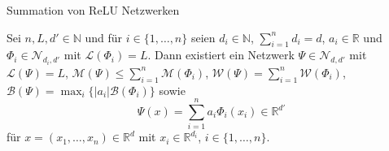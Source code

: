 \documentclass[10pt,aspectratio=169]{beamer}
\theoremstyle{plain} %
\theoremstyle{remark} %
\newcommand{\N}{\mathbb{N}} %
\newcommand{\R}{\mathbb{R}} %
\newcommand{\set}[1]{\{#1\}}
\begin{document}
\begin{frame}{Summation von ReLU Netzwerken}
    \begin{lemma}
        Sei \(n, L, d' \in\N\) und für \(i\in \set{1,\ldots, n}\) seien \(d_i \in \N\), \(\sum_{i=1}^n d_i = d\), 
        \(a_i \in \R\) und \(\Phi_i \in \mathcal{N}_{d_i, d'}\) 
        mit \(\mathcal{L}(\Phi_i) = L\). Dann existiert ein Netzwerk \(\Psi \in \mathcal{N}_{d, d'}\) 
        mit \(\mathcal{L}(\Psi) = L\), \(\mathcal{M}(\Psi) \leq \sum_{i=1}^n \mathcal{M}(\Phi_i)\), 
        \(\mathcal{W}(\Psi) = \sum_{i=1}^n \mathcal{W}(\Phi_i)\), \(\mathcal{B}(\Psi) = \max_i \set{|a_i| \mathcal{B}(\Phi_i)}\) sowie 
        \[ \Psi(x) = \sum_{i=1}^n a_i \Phi_i(x_i) \in \R^{d'} \]
        für \(x = (x_1, \ldots, x_n) \in \R^{d}\) mit \(x_i \in \R^{d_i}\), \(i\in \set{1,\ldots, n}\).
    \end{lemma}
\end{frame}
\end{document}
